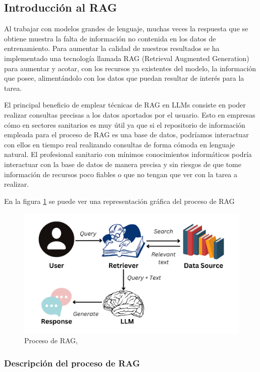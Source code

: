 \subsection{Introducción al RAG}

Al trabajar con modelos grandes de lenguaje, muchas veces la respuesta que se obtiene muestra la falta de información no contenida en los datos de entrenamiento. Para aumentar la calidad de nuestros resultados se ha implementado una tecnología llamada RAG (Retrieval Augmented Generation) para aumentar y acotar, con los recursos ya existentes del modelo, la información que posee, alimentándolo con los datos que puedan resultar de interés para la tarea.

El principal beneficio de emplear técnicas de RAG en LLMs consiste en poder realizar consultas precisas a los datos aportados por el usuario. Esto en empresas cómo en sectores sanitarios es muy útil ya que si el repositorio de información empleada para el proceso de RAG es una base de datos, podríamos interactuar con ellos en tiempo real realizando consultas de forma cómoda en lenguaje natural. El profesional sanitario con mínimos conocimientos informáticos podría interactuar con la base de datos de manera precisa y sin riesgos de que tome información de recursos poco fiables o que no tengan que ver con la tarea a realizar.

En la figura \ref{fig:ragrpoc} se puede ver una representación gráfica del proceso de RAG

\begin{figure}[h]
    \centering
    \includegraphics[width=1\textwidth]{img/ragproc.png}
    \caption{Proceso de RAG, \cite{natassha_selvaraj_what_2024}}
    \label{fig:ragrpoc}
\end{figure}


\subsubsection{Descripción del proceso de RAG}

